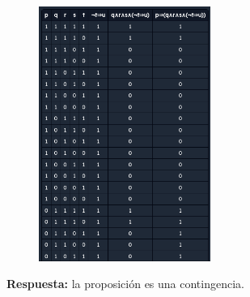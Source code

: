 \documentclass[12pt]{article}
\begin{document}
\begin{itemize}
\begin{enumerate}
                    \begin{figure}[!h]
                        \centering
                        \includegraphics[width=0.5\textwidth]{Img/Tarea8_b_ej3.png}
                    \end{figure} \vspace{0.5cm}\vspace{0.5cm}
                    \par\textbf{Respuesta: } la proposición es una contingencia. \vspace{0.5cm}


\end{enumerate}
\end{itemize}
\end{document}
